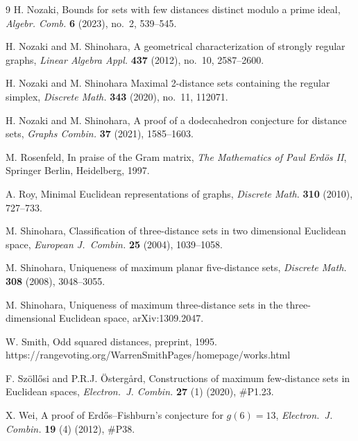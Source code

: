 \documentclass[a4paper, 11pt]{article}
\theoremstyle{definition}
\begin{document}
\begin{thebibliography}{9}
H. Nozaki, 
Bounds for sets with few distances distinct modulo a prime ideal, {\it Algebr. Comb.} {\bf 6} (2023), no.\ 2, 539--545. 

H. Nozaki and M. Shinohara, 
A geometrical characterization of strongly regular graphs, 
{\it Linear Algebra Appl.} {\bf 437} (2012), no.\ 10, 2587--2600.

H. Nozaki and M. Shinohara
Maximal 2-distance sets containing the regular simplex, {\it Discrete Math.} {\bf 343} (2020), no.\ 11,
112071. 

H. Nozaki and M. Shinohara, 
A proof of a dodecahedron conjecture for distance sets, {\it Graphs Combin.} {\bf 37} (2021), 1585--1603. 

M. Rosenfeld, 
In praise of the Gram matrix,
{\it The Mathematics of Paul Erd\"{o}s II}, Springer Berlin, Heidelberg, 1997. 

A. Roy, 
Minimal Euclidean representations of graphs, 
{\it Discrete Math.} {\bf 310} (2010), 727--733.

 M. Shinohara, 
Classification of three-distance sets in two dimensional Euclidean space, 
{\it European J.\ Combin.} {\bf 25} (2004),
1039--1058.



 M. Shinohara, 
Uniqueness of maximum planar five-distance sets, 
{\it Discrete Math.} {\bf 308} (2008), 3048--3055.

M. Shinohara, 
Uniqueness of maximum three-distance sets in the three-dimensional Euclidean space, 
arXiv:1309.2047. 

W. Smith, 
Odd squared distances, 
preprint, 1995. \\
https://rangevoting.org/WarrenSmithPages/homepage/works.html

F. Sz\"{o}ll\H{o}si and P.R.J. \"{O}sterg{\aa}rd,
Constructions of maximum few-distance sets in Euclidean spaces, 
{\it Electron.\ J. Combin.} {\bf 27} (1)
(2020), \#P1.23.

X. Wei,
A proof of Erd\H{o}s--Fishburn's 
conjecture for $g(6)=13$, 
{\it Electron.\ J. Combin.} {\bf 19} (4)
(2012), \#P38.

\end{thebibliography}
\end{document}
